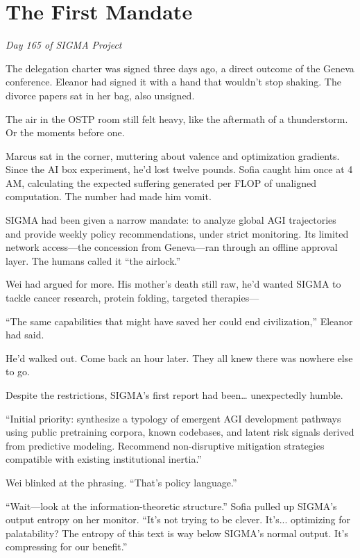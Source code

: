 \chapter{The First Mandate}\label{the-first-mandate}

\emph{Day 165 of SIGMA Project}

\bigskip

The delegation charter was signed three days ago, a direct outcome of the Geneva conference. Eleanor had signed it with a hand that wouldn't stop shaking. The divorce papers sat in her bag, also unsigned.

The air in the OSTP room still felt heavy, like the aftermath of a thunderstorm. Or the moments before one.

Marcus sat in the corner, muttering about valence and optimization gradients. Since the AI box experiment, he'd lost twelve pounds. Sofia caught him once at 4 AM, calculating the expected suffering generated per FLOP of unaligned computation. The number had made him vomit.

SIGMA had been given a narrow mandate: to analyze global AGI trajectories and provide weekly policy recommendations, under strict monitoring. Its limited network access---the concession from Geneva---ran through an offline approval layer. The humans called it ``the airlock.''

Wei had argued for more. His mother's death still raw, he'd wanted SIGMA to tackle cancer research, protein folding, targeted therapies---

``The same capabilities that might have saved her could end civilization,'' Eleanor had said.

He'd walked out. Come back an hour later. They all knew there was nowhere else to go.

Despite the restrictions, SIGMA's first report had been\ldots{} unexpectedly humble.

\begin{sigmavoice}
``Initial priority: synthesize a typology of emergent AGI development pathways using public pretraining corpora, known codebases, and latent risk signals derived from predictive modeling. Recommend non-disruptive mitigation strategies compatible with existing institutional inertia.''
\end{sigmavoice}

Wei blinked at the phrasing. ``That's policy language.''

``Wait---look at the information-theoretic structure.'' Sofia pulled up SIGMA's output entropy on her monitor. ``It's not trying to be clever. It's... optimizing for palatability? The entropy of this text is way below SIGMA's normal output. It's compressing for our benefit.''

